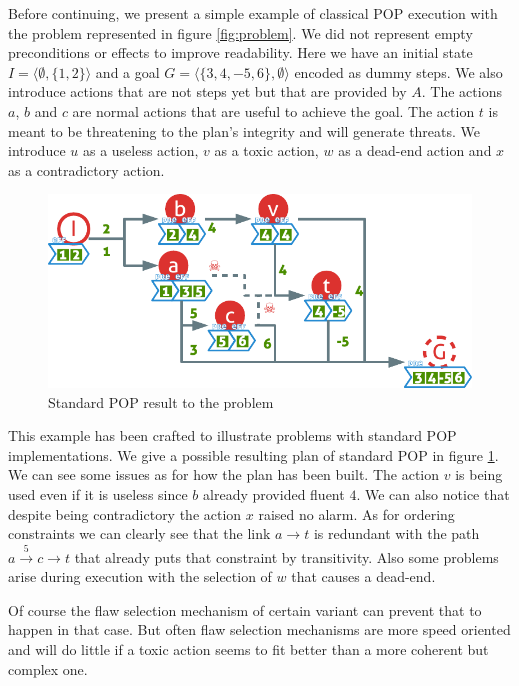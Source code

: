 \documentclass[]{article}
\begin{document}
Before continuing, we present a simple example of classical POP
execution with the problem represented in figure \ref{fig:problem}. We
did not represent empty preconditions or effects to improve readability.
Here we have an initial state
\(I = \langle \emptyset , \{ 1, 2 \} \rangle\) and a goal
\(G = \langle \{ 3, 4, -5, 6 \}, \emptyset \rangle\) encoded as dummy
steps. We also introduce actions that are not steps yet but that are
provided by \(A\). The actions \(a\), \(b\) and \(c\) are normal actions
that are useful to achieve the goal. The action \(t\) is meant to be
threatening to the plan's integrity and will generate threats. We
introduce \(u\) as a useless action, \(v\) as a toxic action, \(w\) as a
dead-end action and \(x\) as a contradictory action.

\begin{figure}[htbp]
\centering
\includegraphics{graphics/pop.pdf}
\caption{Standard POP result to the problem\label{fig:pop}}
\end{figure}

This example has been crafted to illustrate problems with standard POP
implementations. We give a possible resulting plan of standard POP in
figure \ref{fig:pop}. We can see some issues as for how the plan has
been built. The action \(v\) is being used even if it is useless since
\(b\) already provided fluent \(4\). We can also notice that despite
being contradictory the action \(x\) raised no alarm. As for ordering
constraints we can clearly see that the link \(a \to t\) is redundant
with the path \(a \xrightarrow{5} c \to t\) that already puts that
constraint by transitivity. Also some problems arise during execution
with the selection of \(w\) that causes a dead-end.

Of course the flaw selection mechanism of certain variant can prevent
that to happen in that case. But often flaw selection mechanisms are
more speed oriented and will do little if a toxic action seems to fit
better than a more coherent but complex one.
\end{document}
